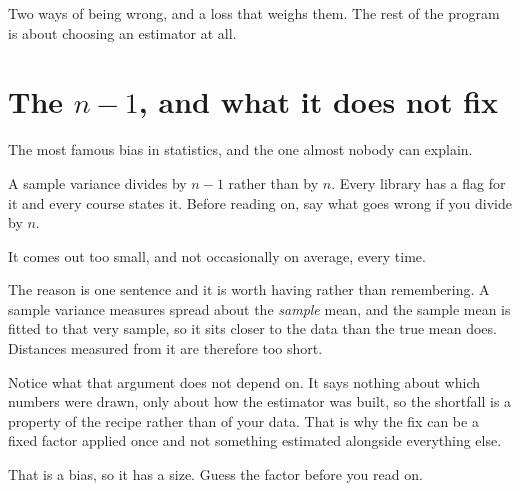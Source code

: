 \begin{fr}

Two ways of being wrong, and a loss that weighs them. The rest of the program
is about choosing an estimator at all.
\end{fr}

\section{The $n-1$, and what it does not fix}
\label{sec:P26-n-minus-one}

\begin{fr}
The most famous bias in statistics, and the one almost nobody can explain.

A sample variance divides by $n-1$ rather than by $n$. Every library has a
flag for it and every course states it. Before reading on, say what goes
wrong if you divide by $n$.
\dotline
\nextframe
\end{fr}

\begin{fr}
\begin{ansblock}
It comes out too small, and not occasionally \dash{} on average, every time.
\end{ansblock}

The reason is one sentence and it is worth having rather than remembering.
A sample variance measures spread about the \emph{sample} mean, and the
sample mean is fitted to that very sample, so it sits closer to the data than
the true mean does. Distances measured from it are therefore too short.

Notice what that argument does not depend on. It says nothing about which
numbers were drawn, only about how the estimator was built, so the shortfall
is a property of the recipe rather than of your data. That is why the fix can
be a fixed factor applied once and not something estimated alongside
everything else.

That is a bias, so it has a size. Guess the factor before you read on.
\dotline
\nextframe
\end{fr}

